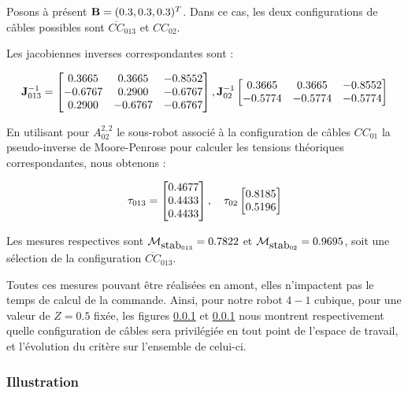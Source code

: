 Posons à présent ${\bf B} = (0.3,0.3,0.3)^T$. Dans ce cas, les deux configurations de câbles possibles sont $\overline{CC}_{013}$ et $CC_{02}$.

Les jacobiennes inverses correspondantes sont :

\begin{equation}
{\bf J}^{-1}_{013} = 
\begin{bmatrix}
0.3665 & 0.3665 & -0.8552 \\  
-0.6767 & 0.2900 & -0.6767 \\  
0.2900 & -0.6767 & -0.6767
\end{bmatrix},
{\bf J}^{-1}_{02}
\begin{bmatrix}
0.3665 & 0.3665 & -0.8552 \\  
-0.5774 & -0.5774 & -0.5774
\end{bmatrix}
\label{chap01:eq08}
\end{equation}

En utilisant pour $A^{2,2}_{02}$ le sous-robot associé à la configuration de câbles $CC_{01}$ la pseudo-inverse de Moore-Penrose pour calculer les tensions théoriques correspondantes, nous obtenons :

\begin{equation}
{\bf \tau}_{013} = 
\begin{bmatrix}
0.4677 \\
0.4433 \\
0.4433
\end{bmatrix},
\quad
{\bf \tau}_{02}
\begin{bmatrix}
0.8185 \\ 
0.5196 
\end{bmatrix}
\label{chap01:eq09}
\end{equation}

Les mesures respectives sont $\mathcal M_{\hbox {stab}_{013}} = 0.7822$ et $\mathcal M_{\hbox {stab}_{02}} = 0.9695$, soit une sélection de la configuration $\overline{CC}_{013}$.

Toutes ces mesures pouvant être réalisées en amont, elles n'impactent pas le temps de calcul de la commande. Ainsi, pour notre robot $4-1$ cubique, pour une valeur de $Z = 0.5$ fixée, les figures \ref{} et \ref{} nous montrent respectivement quelle configuration de câbles sera privilégiée en tout point de l'espace de travail, et l'évolution du critère sur l'ensemble de celui-ci.

\subsubsection{Illustration}

